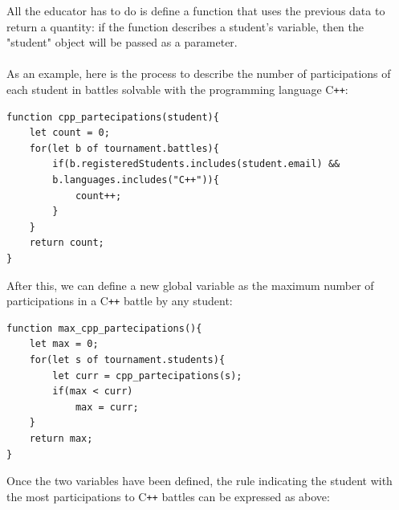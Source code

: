 All the educator has to do is define a function that uses the previous data to return a quantity: if the function describes a student's variable, then the "student" object will be passed as a parameter.\\
\newpage
\textbf{ }\\
As an example, here is the process to describe the number of participations of each student in battles solvable with the programming language C\texttt{++}:

\begin{verbatim}
function cpp_partecipations(student){
    let count = 0;
    for(let b of tournament.battles){
        if(b.registeredStudents.includes(student.email) && 
        b.languages.includes("C++")){
            count++;
        }
    }
    return count;
}
\end{verbatim}
After this, we can define a new global variable as the maximum number of participations in a C\texttt{++} battle by any student:

\begin{verbatim}
function max_cpp_partecipations(){
    let max = 0;
    for(let s of tournament.students){
        let curr = cpp_partecipations(s);
        if(max < curr)
            max = curr;
    }
    return max;
}
\end{verbatim}
Once the two variables have been defined, the rule indicating the student with the most participations to C\texttt{++} battles can be expressed as above:

